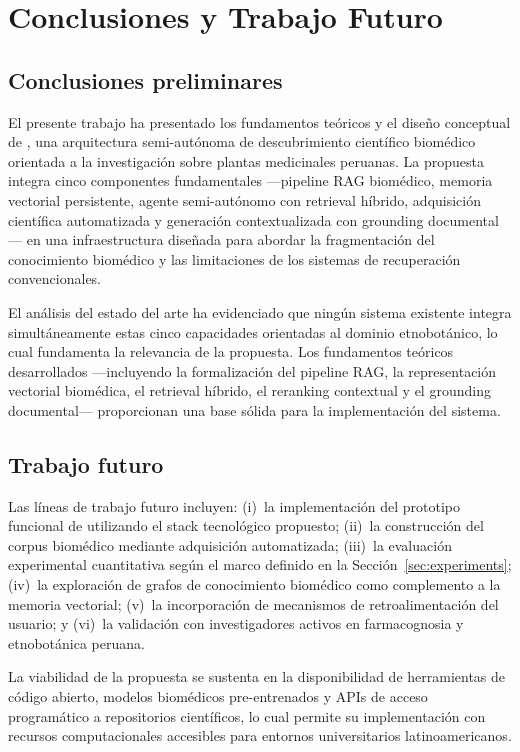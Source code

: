 
\section{Conclusiones y Trabajo Futuro}
\label{sec:conclusion}

\subsection{Conclusiones preliminares}

El presente trabajo ha presentado los fundamentos teóricos y el diseño conceptual de \sirca{}, una arquitectura semi-autónoma de descubrimiento científico biomédico orientada a la investigación sobre plantas medicinales peruanas. La propuesta integra cinco componentes fundamentales —pipeline RAG biomédico, memoria vectorial persistente, agente semi-autónomo con retrieval híbrido, adquisición científica automatizada y generación contextualizada con grounding documental— en una infraestructura diseñada para abordar la fragmentación del conocimiento biomédico y las limitaciones de los sistemas de recuperación convencionales.

El análisis del estado del arte ha evidenciado que ningún sistema existente integra simultáneamente estas cinco capacidades orientadas al dominio etnobotánico, lo cual fundamenta la relevancia de la propuesta. Los fundamentos teóricos desarrollados —incluyendo la formalización del pipeline RAG, la representación vectorial biomédica, el retrieval híbrido, el reranking contextual y el grounding documental— proporcionan una base sólida para la implementación del sistema.

\subsection{Trabajo futuro}

Las líneas de trabajo futuro incluyen: (i)~la implementación del prototipo funcional de \sirca{} utilizando el stack tecnológico propuesto; (ii)~la construcción del corpus biomédico mediante adquisición automatizada; (iii)~la evaluación experimental cuantitativa según el marco definido en la Sección~\ref{sec:experiments}; (iv)~la exploración de grafos de conocimiento biomédico como complemento a la memoria vectorial; (v)~la incorporación de mecanismos de retroalimentación del usuario; y (vi)~la validación con investigadores activos en farmacognosia y etnobotánica peruana.

La viabilidad de la propuesta se sustenta en la disponibilidad de herramientas de código abierto, modelos biomédicos pre-entrenados y APIs de acceso programático a repositorios científicos, lo cual permite su implementación con recursos computacionales accesibles para entornos universitarios latinoamericanos.

